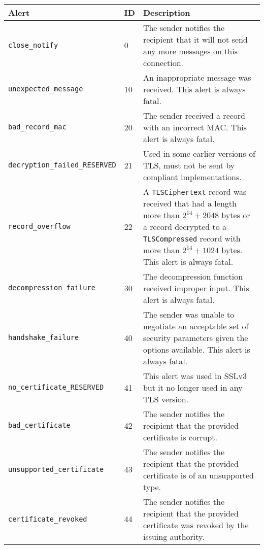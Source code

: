      \\
    \noindent\begin{tabularx}{\linewidth}{@{}l l X}
    \caption{TLS alerts}\label{tab:tls-alerts} \\
    \toprule
    \textbf{Alert} & \textbf{ID} & \textbf{Description} \\
    \midrule
    \endhead
    \texttt{close\_notify}                & 0   & The sender notifies the recipient that it will not send any more messages
                                                  on this connection. \\
    \texttt{unexpected\_message}          & 10  & An inappropriate message was received. This alert is always fatal. \\
    \texttt{bad\_record\_mac}             & 20  & The sender received a record with an incorrect MAC. This alert is always fatal. \\
    \texttt{decryption\_failed\_RESERVED} & 21  & Used in some earlier versions of TLS, must not be sent by compliant implementations. \\
    \texttt{record\_overflow}             & 22  & A \texttt{TLSCiphertext} record was received that had a length more than $2^{14}+2048$ bytes or
                                                  a record decrypted to a \texttt{TLSCompressed} record with more than $2^{14}+1024$ bytes. This alert
                                                  is always fatal. \\
    \texttt{decompression\_failure}       & 30  & The decompression function received improper input. This alert is always fatal. \\
    \texttt{handshake\_failure}           & 40  & The sender was unable to negotiate an acceptable set of security parameters given
                                                  the options available. This alert is always fatal. \\
    \texttt{no\_certificate\_RESERVED}    & 41  & This alert was used in SSLv3 but it no longer used in any TLS version. \\
    \texttt{bad\_certificate}             & 42  & The sender notifies the recipient that the provided certificate is corrupt. \\
    \texttt{unsupported\_certificate}     & 43  & The sender notifies the recipient that the provided certificate is of an unsupported type. \\
    \texttt{certificate\_revoked}         & 44  & The sender notifies the recipient that the provided certificate was revoked by the issuing authority. \\

\end{tabularx}
